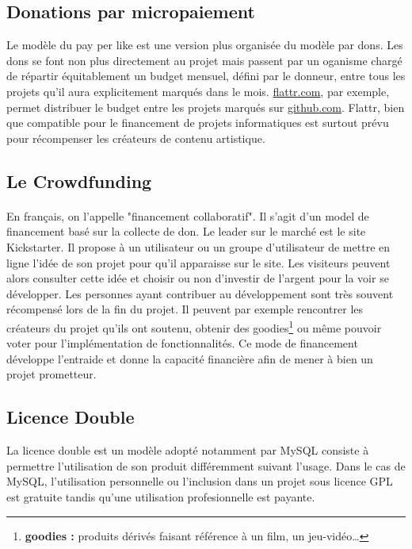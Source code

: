     \subsection{Donations par micropaiement}

Le modèle du pay per like est une version plus organisée du modèle par dons.
Les dons se font non plus directement au projet mais passent par un oganisme
chargé de répartir équitablement un budget mensuel, défini par le donneur,
entre tous les projets qu'il aura explicitement marqués dans le mois.
\url{flattr.com}, par exemple, permet distribuer le budget entre les projets
marqués sur \url{github.com}. Flattr, bien que compatible pour le financement
de projets informatiques est surtout prévu pour récompenser les créateurs de
contenu artistique.

    \subsection{Le Crowdfunding}

\paragraph{} En français, on l'appelle "financement collaboratif". Il s'agit
d'un model de financement basé sur la collecte de don. Le leader sur le marché
est le site Kickstarter. Il propose à un utilisateur ou un groupe d'utilisateur
de mettre en ligne l'idée de son projet pour qu'il apparaisse sur le site. Les
visiteurs peuvent alors consulter cette idée et choisir ou non d'investir de
l'argent pour la voir se développer. Les personnes ayant contribuer au
développement sont très souvent récompensé lors de la fin du projet. Il peuvent
par exemple rencontrer les créateurs du projet qu'ils ont soutenu, obtenir des
goodies\footnote{\textbf{goodies :} produits dérivés faisant référence à un
film, un jeu-vidéo\ldots} ou même pouvoir voter pour l'implémentation de
fonctionnalités.  Ce mode de financement développe l'entraide et donne la
capacité financière afin de mener à bien un projet prometteur.

    \subsection{Licence Double}

La licence double est un modèle adopté notamment par MySQL consiste à permettre
l'utilisation de son produit différemment suivant l'usage. Dans le cas de
MySQL, l'utilisation personnelle ou l'inclusion dans un projet sous licence GPL
est gratuite tandis qu'une utilisation profesionnelle est payante.

